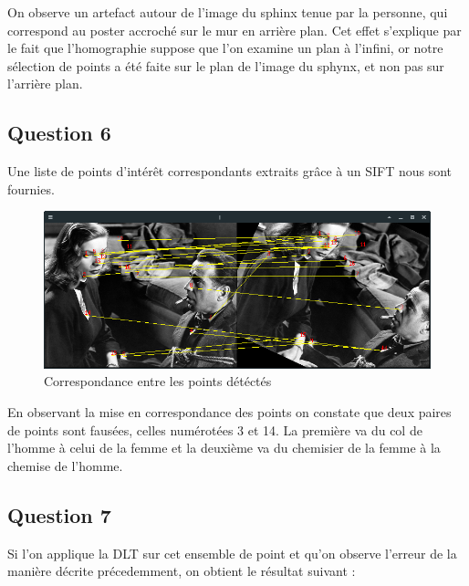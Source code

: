 \documentclass[12pt]{report}
\begin{document}
On observe un artefact autour de l'image du sphinx tenue par la personne, qui correspond au poster accroché sur le mur en arrière plan. Cet effet s'explique par le fait que l'homographie suppose que l'on examine un plan à l'infini, or notre sélection de points a été faite sur le plan de l'image du sphynx, et non pas sur l'arrière plan.


\subsection{Question 6}

Une liste de points d'intérêt correspondants extraits grâce à un SIFT nous sont fournies.

\begin{figure}
\begin{center}
\includegraphics[scale=0.6]{Images/correspondance.jpg}
\caption{Correspondance entre les points détéctés}
\end{center}
\end{figure}

En observant la mise en correspondance des points on constate que deux paires de points sont fausées, celles numérotées 3 et 14. La première va du col de l'homme à celui de la femme et la deuxième va du chemisier de la femme à la chemise de l'homme.

\subsection{Question 7}

Si l'on applique la DLT sur cet ensemble de point et qu'on observe l'erreur de la manière décrite précedemment, on obtient le résultat suivant :
\end{document}
